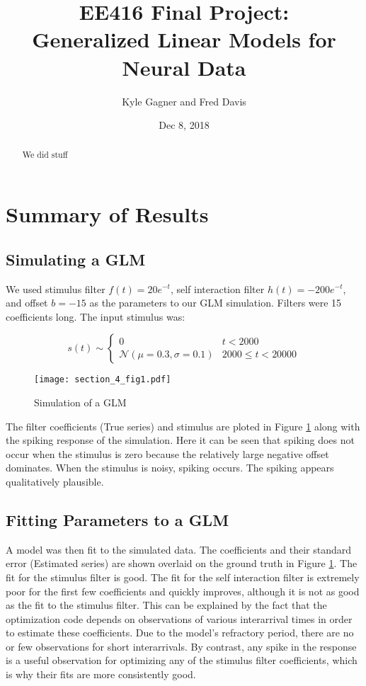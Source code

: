 \documentclass[letterpaper,titlepage,10pt]{article}
\title{EE416 Final Project:\\Generalized Linear Models for Neural Data}
\date{Dec 8, 2018}
\author{Kyle Gagner and Fred Davis}
\begin{document}
\maketitle

\begin{abstract}
We did stuff
\end{abstract}

\section{Summary of Results}

\subsection{Simulating a GLM}

We used stimulus filter $f(t)=20e^{-t}$, self interaction filter $h(t)=-200e^{-t}$, and offset $b=-15$ as the
parameters to our GLM simulation. Filters were 15 coefficients long. The input stimulus was:

$$s(t)\sim
\begin{cases}
0 & t < 2000\\
\mathcal{N}(\mu=0.3, \sigma=0.1) & 2000 \leq t < 20000
\end{cases}$$

\begin{figure}[h]
\texttt{[image: section\_4\_fig1.pdf]}
\caption{Simulation of a GLM}
\label{fig41}
\end{figure}

The filter coefficients (True series) and stimulus are ploted in Figure \ref{fig41} along with the spiking
response of the simulation. Here it can be seen that spiking does not occur when the stimulus is zero because the
relatively large negative offset dominates. When the stimulus is noisy, spiking occurs. The spiking appears
qualitatively plausible.

\subsection{Fitting Parameters to a GLM}

A model was then fit to the simulated data. The coefficients and their standard error (Estimated series) are shown
overlaid on the ground truth in Figure \ref{fig41}. The fit for the stimulus filter is good. The fit for the
self interaction filter is extremely poor for the first few coefficients and quickly improves, although it is not as
good as the fit to the stimulus filter. This can be explained by the fact that the optimization code depends on
observations of various interarrival times in order to estimate these coefficients. Due to the model's refractory
period, there are no or few observations for short interarrivals. By contrast, any spike in the response is a useful
observation for optimizing any of the stimulus filter coefficients, which is why their fits are more consistently good.
\end{document}
